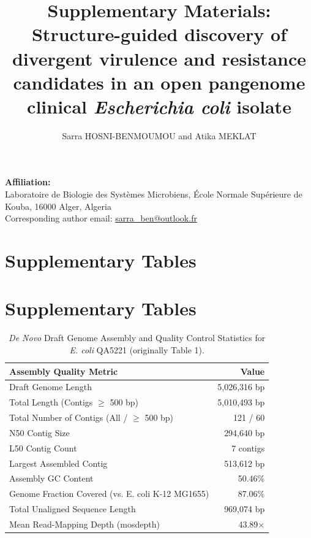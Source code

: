 \documentclass[review,11pt]{article}
\title{Supplementary Materials: \\ Structure-guided discovery of divergent virulence and resistance candidates in an open pangenome clinical \textit{Escherichia coli} isolate}
\author{Sarra HOSNI-BENMOUMOU and Atika MEKLAT}
\date{}
\begin{document}
\maketitle

\noindent
\textbf{Affiliation:} \\
Laboratoire de Biologie des Systèmes Microbiens, École Normale Supérieure de Kouba, 16000 Alger, Algeria \\
Corresponding author email: \href{mailto:sarra_ben@outlook.fr}{sarra\_ben@outlook.fr}

\vspace{1cm}

\section{Supplementary Tables}

\section{Supplementary Tables}

\begin{table}[H]
\centering
\caption{\textit{De Novo} Draft Genome Assembly and Quality Control Statistics for \textit{E. coli} QA5221 (originally Table 1).}
\label{tab:assembly_qc}
\begin{tabular}{lr}
\toprule
\textbf{Assembly Quality Metric} & \textbf{Value} \\
\midrule
Draft Genome Length & 5,026,316 bp \\
Total Length (Contigs $\ge$ 500 bp) & 5,010,493 bp \\
Total Number of Contigs (All / $\ge$ 500 bp) & 121 / 60 \\
N50 Contig Size & 294,640 bp \\
L50 Contig Count & 7 contigs \\
Largest Assembled Contig & 513,612 bp \\
Assembly GC Content & 50.46\% \\
Genome Fraction Covered (vs. E. coli K-12 MG1655) & 87.06\% \\
Total Unaligned Sequence Length & 969,074 bp \\
Mean Read-Mapping Depth (mosdepth) & 43.89$\times$ \\
\bottomrule
\end{tabular}%
\end{table}
\end{document}
